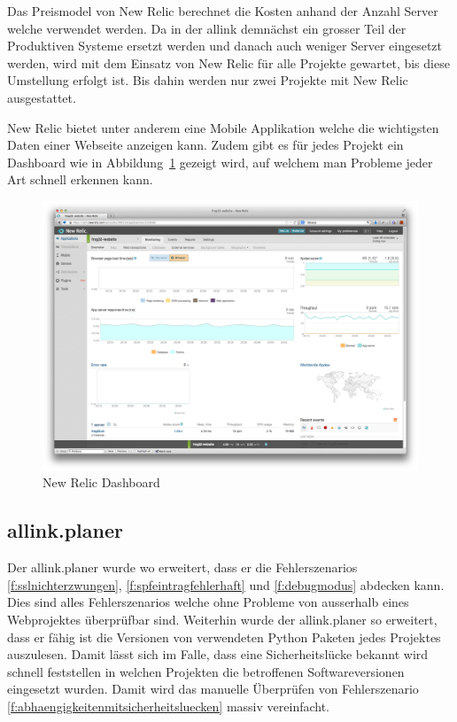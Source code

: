 Das Preismodel von New Relic berechnet die Kosten anhand der Anzahl Server welche verwendet werden. Da in der allink demnächst ein grosser Teil der Produktiven Systeme ersetzt werden und danach auch weniger Server eingesetzt werden, wird mit dem Einsatz von New Relic für alle Projekte gewartet, bis diese Umstellung erfolgt ist. Bis dahin werden nur zwei Projekte mit New Relic ausgestattet.

New Relic bietet unter anderem eine Mobile Applikation welche die wichtigsten Daten einer Webseite anzeigen kann. Zudem gibt es für jedes Projekt ein Dashboard wie in Abbildung~\ref{fig:new_relic_dashboard} gezeigt wird, auf welchem man Probleme jeder Art schnell erkennen kann.

\begin{figure}[ht]
\centering
\includegraphics[width=1\textwidth]{images/new_relic.png}
\caption{New Relic Dashboard}
\label{fig:new_relic_dashboard}
\end{figure}


\subsection{allink.planer}
\label{sub:proof_allink_planer}
Der allink.planer wurde wo erweitert, dass er die Fehlerszenarios \ref{f:sslnichterzwungen}, \ref{f:spfeintragfehlerhaft} und \ref{f:debugmodus} abdecken kann. Dies sind alles Fehlerszenarios welche ohne Probleme von ausserhalb eines Webprojektes überprüfbar sind. Weiterhin wurde der allink.planer so erweitert, dass er fähig ist die Versionen von verwendeten Python Paketen jedes Projektes auszulesen. Damit lässt sich im Falle, dass eine Sicherheitslücke bekannt wird schnell feststellen in welchen Projekten die betroffenen Softwareversionen eingesetzt wurden. Damit wird das manuelle Überprüfen von Fehlerszenario \ref{f:abhaengigkeitenmitsicherheitsluecken} massiv vereinfacht.

